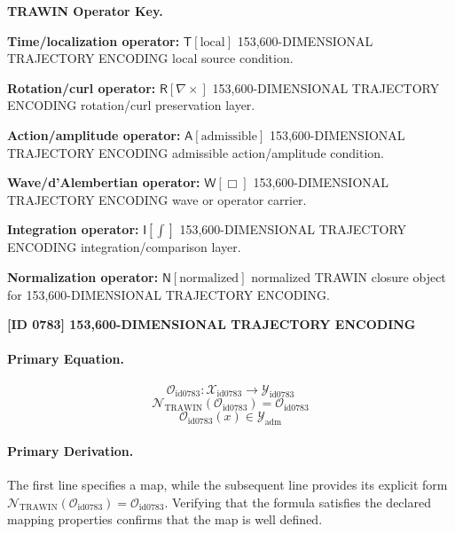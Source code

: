 \par\vspace{0.45\baselineskip}
\noindent\begin{minipage}[t]{\linewidth}
\begingroup
\small
\raggedright
\textbf{TRAWIN Operator Key.}\par
\noindent\textbf{Time/localization operator:} $\mathsf{T}\!\left[\mathrm{local}\right]$ 153,600-DIMENSIONAL TRAJECTORY ENCODING local source condition.\par
\noindent\textbf{Rotation/curl operator:} $\mathsf{R}\!\left[\nabla\times\right]$ 153,600-DIMENSIONAL TRAJECTORY ENCODING rotation/curl preservation layer.\par
\noindent\textbf{Action/amplitude operator:} $\mathsf{A}\!\left[\mathrm{admissible}\right]$ 153,600-DIMENSIONAL TRAJECTORY ENCODING admissible action/amplitude condition.\par
\noindent\textbf{Wave/d'Alembertian operator:} $\mathsf{W}\!\left[\Box\right]$ 153,600-DIMENSIONAL TRAJECTORY ENCODING wave or operator carrier.\par
\noindent\textbf{Integration operator:} $\mathsf{I}\!\left[\int\right]$ 153,600-DIMENSIONAL TRAJECTORY ENCODING integration/comparison layer.\par
\noindent\textbf{Normalization operator:} $\mathsf{N}\!\left[\mathrm{normalized}\right]$ normalized TRAWIN closure object for 153,600-DIMENSIONAL TRAJECTORY ENCODING.\par
\endgroup
\end{minipage}

\clearpage
\noindent\textbf{[ID 0783] 153,600-DIMENSIONAL TRAJECTORY ENCODING}\par
\vspace{0.35em}
\paragraph{Primary Equation.}
\[
\mathcal{O}_{\mathrm{id0783}}:\mathcal{X}_{\mathrm{id0783}}\longrightarrow\mathcal{Y}_{\mathrm{id0783}}
\]
\[
\mathcal{N}_{\mathrm{TRAWIN}}(\mathcal{O}_{\mathrm{id0783}})=\mathcal{O}_{\mathrm{id0783}}
\]
\[
\mathcal{O}_{\mathrm{id0783}}(x)\in\mathcal{Y}_{\mathrm{adm}}
\]

\paragraph{Primary Derivation.}
The first line specifies a map, while the subsequent line provides its explicit form \( \mathcal{N}_{\mathrm{TRAWIN}}(\mathcal{O}_{\mathrm{id0783}})=\mathcal{O}_{\mathrm{id0783}} \). Verifying that the formula satisfies the declared mapping properties confirms that the map is well defined.

